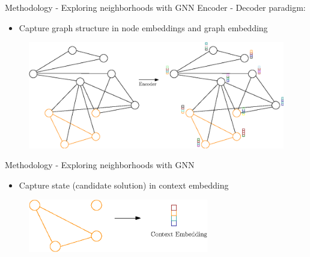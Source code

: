 \documentclass{beamer}
\begin{document}
        

\begin{frame}{Methodology - Exploring neighborhoods with GNN}
Encoder - Decoder paradigm: 
    \begin{itemize}
            \item Capture graph structure in node embeddings and graph embedding
    \end{itemize}
    \begin{figure}
        \centering
        \includegraphics[width=1.0\textwidth]{graphics/graph-encoder.eps}
    \end{figure}
\end{frame}

\begin{frame}{Methodology - Exploring neighborhoods with GNN}
    \begin{itemize}
            \item Capture state (candidate solution) in context embedding
    \end{itemize}
    \begin{figure}
        \centering
        \includegraphics[width=0.7\textwidth]{graphics/graph-state.eps}
    \end{figure}
\end{frame}
\end{document}
